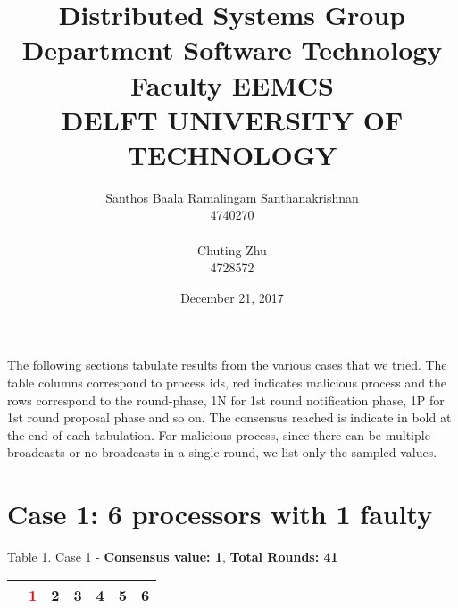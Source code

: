 \documentclass [a4,twoside,11pt] {article}
\begin{document}
\title{
    \flushleft
      {\small 
      {Distributed Systems Group \\
        Department Software Technology\\
      Faculty EEMCS\\
      DELFT UNIVERSITY OF TECHNOLOGY\\}}
}
\author{
  \newblock Santhos Baala Ramalingam Santhanakrishnan \\ 4740270 \\ \\
  \newblock Chuting Zhu \\ 4728572 \\
}
\date{December 21, 2017}
\maketitle

\setcounter{secnumdepth}{1}


The following sections tabulate results from the various cases that we tried. The table columns
correspond to process ids, red indicates malicious process and the rows correspond to the round-phase, 1N for 1st round notification phase, 1P for 1st round proposal phase and so on. The consensus reached is indicate in bold at the end of each tabulation. For malicious process, since there can be multiple broadcasts or no broadcasts in a single round, we list only the sampled values.

\section*{Case 1: 6 processors with 1 faulty}

\begin{center}
\small{Table 1. Case 1 - \textbf{Consensus value: 1}, \textbf{Total Rounds: 41}}
\vspace{-0.5cm}
\end{center}
\small
\begin{longtable}{ccccccc}
  \hline
  & \textcolor{red}{1} & 2 & 3 & 4 & 5 & 6 \\
  \hline
  
\end{longtable}
\end{document}
